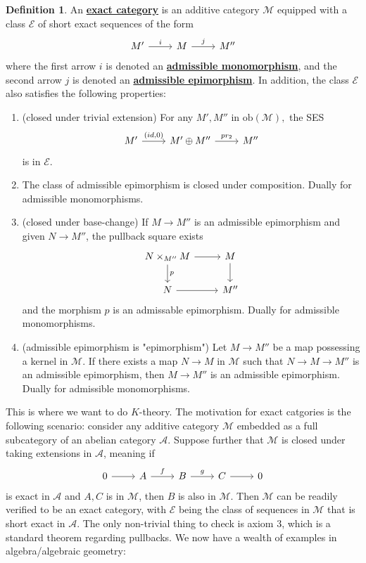 \documentclass{article}
\theoremstyle{definition}
\theoremstyle{definition}
\newtheorem{definition}{Definition}[theorem]
\theoremstyle{definition}
\theoremstyle{definition}
\theoremstyle{definition}
\theoremstyle{definition}
\theoremstyle{definition}
\begin{document}
\begin{tcolorbox}[colback=purple!5!white,colframe=purple!75!black]
\begin{definition}
An \underline{\textbf{exact category}} is an additive category $\mathcal{M}$ equipped with a class $\mathcal{E}$ of short exact sequences of the form
\[\begin{tikzcd}
    M'\arrow[r,"i"]&M\arrow[r,"j"]&M''
    \end{tikzcd}\]
where the first arrow $i$ is denoted an \underline{\textbf{admissible monomorphism}}, and the second arrow $j$ is denoted an \underline{\textbf{admissible epimorphism}}. In addition, the class $\mathcal{E}$ also satisfies the following properties: \\ 
\begin{enumerate}
    \item (closed under trivial extension) For any $M',M''$ in $\textrm{ob}(\mathcal{M}),$ the SES  \[
        \begin{tikzcd}
        M'\arrow[r,"{(id,0)}"]&M'\oplus M''\arrow[r,"pr_2"]&M''
        \end{tikzcd}
        \]
   is in $\mathcal{E}$.
   \item The class of admissible epimorphism is closed under composition. Dually for admissible monomorphisms. 
   \item (closed under base-change) If $M\to M''$ is an admissible epimorphism and given $N\to M''$, the pullback square exists
   \[\begin{tikzcd}
    N\times_{M''}M\arrow[r]\arrow[d,"p"]&M\arrow[d]\\
    N\arrow[r]&M''
   \end{tikzcd}\]
   and the morphism $p$ is an admissable epimorphism. Dually for admissible monomorphisms. 
   \item (admissible epimorphism is "epimorphism") Let $M\to M''$ be a map possessing a kernel in $\mathcal{M}$. If there exists a map $N\to M$ in $\mathcal{M}$ such that $N\to M\to M''$ is an admissible epimorphism, then $M\to M''$ is an admissible epimorphism. Dually for admissible monomorphisms. 
\end{enumerate}
\end{definition}
\end{tcolorbox}


This is where we want to do $K$-theory. The motivation for exact catgories is the following scenario: consider any additive category $\mathcal{M}$ embedded as a full subcategory of an abelian category $\mathcal{A}$. Suppose further that $\mathcal{M}$ is closed under taking extensions in $\mathcal{A}$, meaning if \[\begin{tikzcd}
0\arrow[r]&A\arrow[r,"f"]&B\arrow[r,"g"]&C\arrow[r]&0
\end{tikzcd}\]
is exact in $\mathcal{A}$ and $A,C$ is in $\mathcal{M}$, then $B$ is also in $\mathcal{M}$. Then $\mathcal{M}$ can be readily verified to be an exact category, with $\mathcal{E}$
being the class of sequences in $\mathcal{M}$ that is short exact in $\mathcal{A}$. The only non-trivial thing to check is axiom $3$, which is a standard theorem regarding pullbacks. We now have a wealth of examples in algebra/algebraic geometry:
\end{document}
